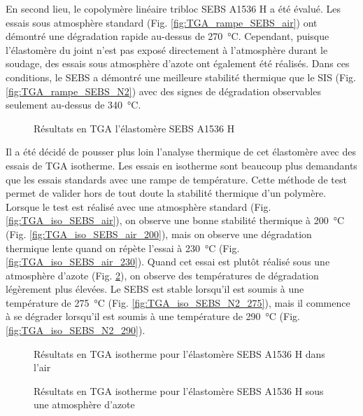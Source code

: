 \FloatBarrier
En second lieu, le copolymère linéaire tribloc SEBS A1536 H a été évalué. 
Les essais sous atmosphère standard (Fig. \ref{fig:TGA_rampe_SEBS_air}) ont démontré une dégradation rapide au-dessus de \SI{270}{\celsius}. 
Cependant, puisque l'élastomère du joint n'est pas exposé directement à l'atmosphère durant le soudage, des essais sous atmosphère d'azote ont également été réalisés. 
Dans ces conditions, le SEBS a démontré une meilleure stabilité thermique que le SIS (Fig. \ref{fig:TGA_rampe_SEBS_N2}) avec des signes de dégradation observables seulement au-dessus de \SI{340}{\celsius}. 

\begin{figure}[h]
	\centering
	\qquad
	\caption{Résultats en TGA l'élastomère SEBS A1536 H}
	\label{fig:TGA_rampe_SEBS}
\end{figure}

Il a été décidé de pousser plus loin l'analyse thermique de cet élastomère avec des essais de TGA isotherme. 
Les essais en isotherme sont beaucoup plus demandants que les essais standards avec une rampe de température. 
Cette méthode de test permet de valider hors de tout doute la stabilité thermique d'un polymère. 
Lorsque le test est réalisé avec une atmosphère standard (Fig. \ref{fig:TGA_iso_SEBS_air}), on observe une bonne stabilité thermique à \SI{200}{\celsius} (Fig. \ref{fig:TGA_iso_SEBS_air_200}), mais on observe une dégradation thermique lente quand on répète l'essai à \SI{230}{\celsius} (Fig. \ref{fig:TGA_iso_SEBS_air_230}). 
Quand cet essai est plutôt réalisé sous une atmosphère d'azote (Fig. \ref{fig:TGA_iso_SEBS_N2}), on observe des températures de dégradation légèrement plus élevées. 
Le SEBS est stable lorsqu'il est soumis à une température de \SI{275}{\celsius} (Fig. \ref{fig:TGA_iso_SEBS_N2_275}), mais il commence à se dégrader lorsqu'il est soumis à une température de \SI{290}{\celsius} (Fig. \ref{fig:TGA_iso_SEBS_N2_290}). 

\begin{figure}[h]
	\centering
	\qquad
	\caption{Résultats en TGA isotherme pour l'élastomère SEBS A1536 H dans l'air}
	\label{fig:TGA_iso_SEBS_air}
	\centering
	\qquad
	\caption{Résultats en TGA isotherme pour l'élastomère SEBS A1536 H sous une atmosphère d'azote}
	\label{fig:TGA_iso_SEBS_N2}
\end{figure}

